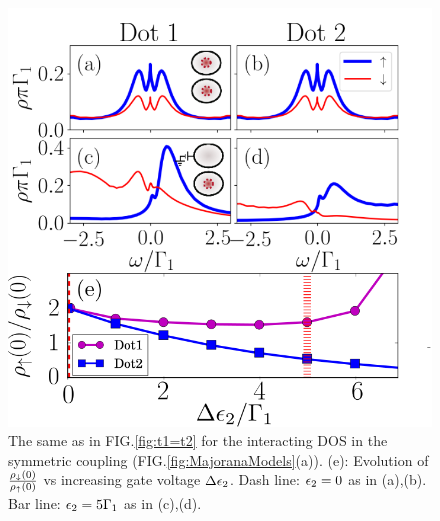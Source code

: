 \documentclass[showpacs,aps,prb,reprint,superscriptaddress]{revtex4-1}
\begin{document}
\begin{figure}[bt]
\begin{center}
\includegraphics[scale=0.45]{Graficos/N2t1=t2.png}
\caption{ \label{fig:Nt1=t2} The same as in FIG.\ref{fig:t1=t2} for the  interacting DOS in the symmetric coupling (FIG.\ref{fig:MajoranaModels}(a)). (e): Evolution of $\frac{\rho_\downarrow(0)}{\rho_\uparrow(0)}$ vs increasing gate voltage $\Delta \epsilon_2$. Dash line: $\epsilon_2 =0$ as in (a),(b). Bar line: $\epsilon_2 =5\Gamma_1$ as in (c),(d).
}
%
\end{center}
\end{figure}
\end{document}

